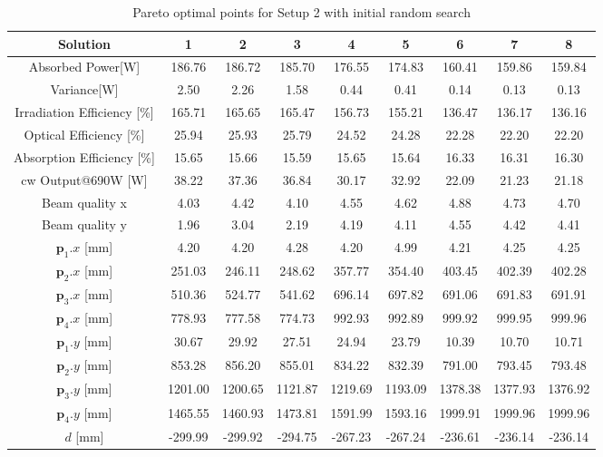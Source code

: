 \documentclass[a4paper,10pt]{article}
\renewcommand{\vec}[1]{\mathbf{#1}}
\begin{document}
    \begin{table}
    \centering
    \setlength\tabcolsep{2pt}
    \renewcommand{\arraystretch}{1.5}
    \begin{tabular}{| c | c | c | c | c | c | c | c | c |}
        \hline
        Solution      &1&2&3&4&5&6&7&8\\
        \hline
        Absorbed Power[W] &186.76&186.72&185.70&176.55&174.83&160.41&159.86&159.84\\
        \hline
        Variance[W] &2.50&2.26&1.58&0.44&0.41&0.14&0.13&0.13\\
        \hline
        Irradiation Efficiency [\%]&165.71&165.65&165.47&156.73&155.21&136.47&136.17&136.16\\
        \hline
        Optical Efficiency [\%]&25.94&25.93&25.79&24.52&24.28&22.28&22.20&22.20\\
        \hline
        Absorption Efficiency [\%]&15.65&15.66&15.59&15.65&15.64&16.33&16.31&16.30\\
        \hline
        cw Output@690W [W]  &38.22&37.36&36.84&30.17&32.92&22.09&21.23&21.18\\
        \hline
        Beam quality x&4.03&4.42&4.10&4.55&4.62&4.88&4.73&4.70\\
        \hline
        Beam quality y&1.96&3.04&2.19&4.19&4.11&4.55&4.42&4.41\\
        \hline
        $\vec{p}_1.x$ [mm] &4.20&4.20&4.28&4.20&4.99&4.21&4.25&4.25\\
        \hline
        $\vec{p}_2.x$ [mm] &251.03&246.11&248.62&357.77&354.40&403.45&402.39&402.28\\
        \hline
        $\vec{p}_3.x$ [mm] &510.36&524.77&541.62&696.14&697.82&691.06&691.83&691.91\\ 
        \hline
        $\vec{p}_4.x$ [mm] &778.93&777.58&774.73&992.93&992.89&999.92&999.95&999.96\\ 
        \hline
        $\vec{p}_1.y$ [mm] &30.67&29.92&27.51&24.94&23.79&10.39&10.70&10.71\\
        \hline
        $\vec{p}_2.y$ [mm] &853.28&856.20&855.01&834.22&832.39&791.00&793.45&793.48\\
        \hline
        $\vec{p}_3.y$ [mm] &1201.00&1200.65&1121.87&1219.69&1193.09&1378.38&1377.93&1376.92\\ 
        \hline
        $\vec{p}_4.y$ [mm] &1465.55&1460.93&1473.81&1591.99&1593.16&1999.91&1999.96&1999.96\\ 
        \hline
        $d$           [mm] &-299.99&-299.92&-294.75&-267.23&-267.24&-236.61&-236.14&-236.14\\
        \hline
    \end{tabular}
    \label{tab:setup2_results_rand}
    \caption{Pareto optimal points for Setup 2 with initial random search}
    \end{table}
\end{document}
